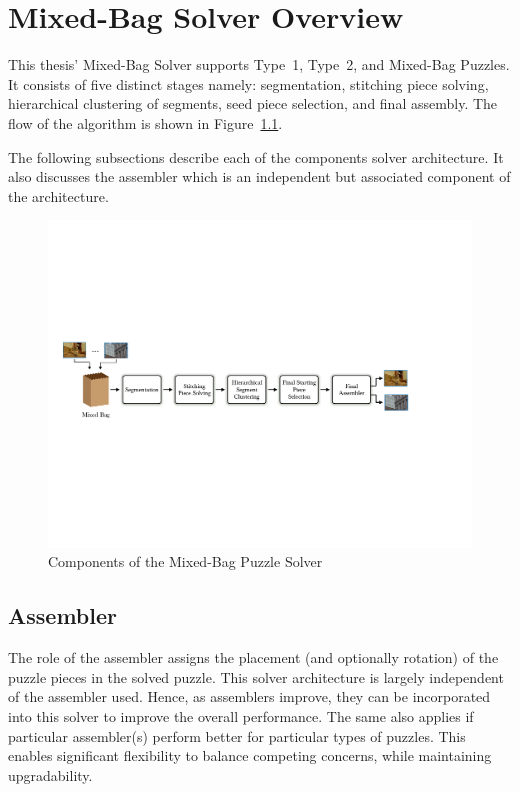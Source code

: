 \chapter{Mixed-Bag Solver Overview}

This thesis' Mixed-Bag Solver supports Type~1, Type~2, and Mixed-Bag Puzzles.  It consists of five distinct stages namely: segmentation, stitching piece solving, hierarchical clustering of segments, seed piece selection, and final assembly.  The flow of the algorithm is shown in Figure~\ref{fig:multipuzzleSolverArchitecture}.

The following subsections describe each of the components solver architecture.  It also discusses the assembler which is an independent but associated component of the architecture.

\begin{figure}[ht!]
	\centering
		\includegraphics[width=1.0\textwidth]{images/cropped_algorithm_structure_overview.pdf}
	\caption{Components of the Mixed-Bag Puzzle Solver}\label{fig:multipuzzleSolverArchitecture}
\end{figure}

\section{Assembler}\label{sec:SolverAssembler}

The role of the assembler assigns the placement (and optionally rotation) of the puzzle pieces in the solved puzzle.  This solver architecture is largely independent of the assembler used.  Hence, as assemblers improve, they can be incorporated into this solver to improve the overall performance.  The same also applies if particular assembler(s) perform better for particular types of puzzles.  This enables significant flexibility to balance competing concerns, while maintaining upgradability.

